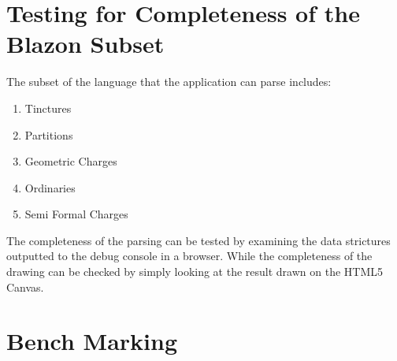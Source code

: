 \section{Testing for Completeness of the Blazon Subset}

The subset of the language that the application can parse includes:

\begin{enumerate}
  \item Tinctures
  \item Partitions
  \item Geometric Charges
  \item Ordinaries 
  \item Semi Formal Charges
\end{enumerate}




The completeness of the parsing can be tested by examining the data strictures outputted to the debug console in a browser.  While the completeness of the drawing can be checked by simply looking at the result drawn on the HTML5 Canvas. 




\section{Bench Marking}









